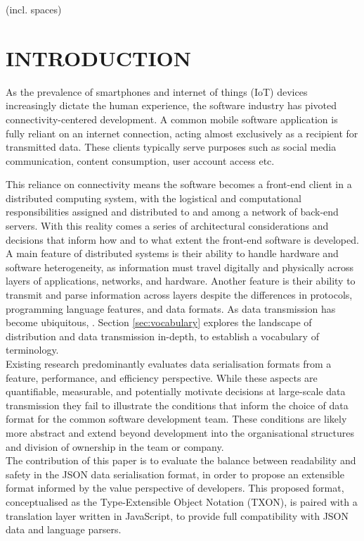\documentclass[../report.tex]{subfiles}
\begin{document}
\color{red}
 (incl. spaces)
\color{black}
\pagebreak

\section{INTRODUCTION}

As the prevalence of smartphones and internet of things (IoT) devices increasingly dictate the human experience, the software industry has pivoted connectivity-centered development. A common mobile software application is fully reliant on an internet connection, acting almost exclusively as a recipient for transmitted data. These clients typically serve purposes such as social media communication, content consumption, user account access etc.

This reliance on connectivity means the software becomes a front-end client in a distributed computing system, with the logistical and computational responsibilities assigned and distributed to and among a network of back-end servers. With this reality comes a series of architectural considerations and decisions that inform how and to what extent the front-end software is developed. \\

A main feature of distributed systems is their ability to handle hardware and software heterogeneity, as information must travel digitally and physically across layers of applications, networks, and hardware. Another feature is their ability to transmit and parse information across layers despite the differences in protocols, programming language features, and data formats. As data transmission has become ubiquitous, . Section \ref{sec:vocabulary} explores the landscape of distribution and data transmission in-depth, to establish a vocabulary of terminology. \\

Existing research predominantly evaluates data serialisation formats from a feature, performance, and efficiency perspective. While these aspects are quantifiable, measurable, and potentially motivate decisions at large-scale data transmission they fail to illustrate the conditions that inform the choice of data format for the common software development team. These conditions are likely more abstract and extend beyond development into the organisational structures and division of ownership in the team or company. \\

The contribution of this paper is to evaluate the balance between readability and safety in the JSON data serialisation format, in order to propose an extensible format informed by the value perspective of developers. This proposed format, conceptualised as the Type-Extensible Object Notation (TXON), is paired with a translation layer written in JavaScript, to provide full compatibility with JSON data and language parsers.
\end{document}
